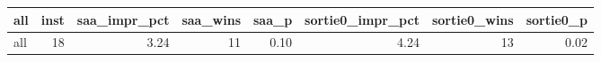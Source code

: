 \begin{tabular}{lrrrrrrr}
\toprule
all & inst & saa_impr_pct & saa_wins & saa_p & sortie0_impr_pct & sortie0_wins & sortie0_p \\
\midrule
all & 18 & 3.24 & 11 & 0.10 & 4.24 & 13 & 0.02 \\
\bottomrule
\end{tabular}
